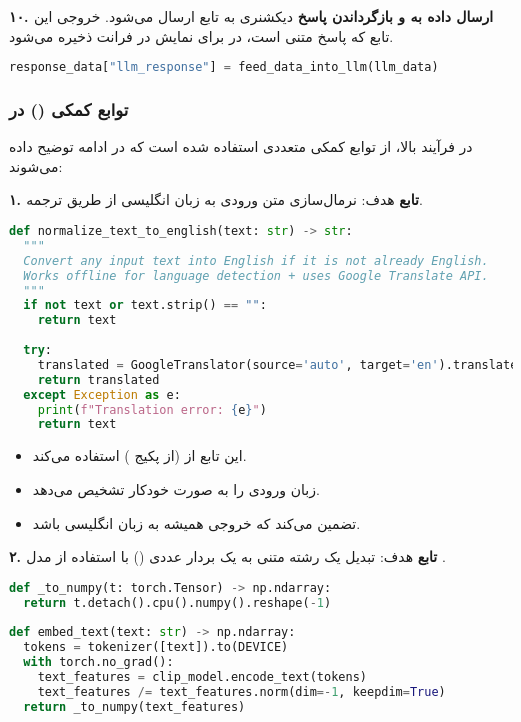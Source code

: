 \documentclass{article}
\begin{document}
\textbf{۱۰. ارسال داده به  و بازگرداندن پاسخ}
دیکشنری  به تابع  ارسال می‌شود. خروجی این تابع که پاسخ متنی  است، در  برای نمایش در فرانت ذخیره می‌شود.

\begin{latin}
\begin{lstlisting}[language=Python]
response_data["llm_response"] = feed_data_into_llm(llm_data)
\end{lstlisting}
\end{latin}

\subsubsection{توابع کمکی () در }

در فرآیند بالا، از توابع کمکی متعددی استفاده شده است که در ادامه توضیح داده می‌شوند:

\textbf{۱. تابع }
هدف: نرمال‌سازی متن ورودی به زبان انگلیسی از طریق ترجمه.

\begin{latin}
\begin{lstlisting}[language=Python]
def normalize_text_to_english(text: str) -> str:
  """
  Convert any input text into English if it is not already English.
  Works offline for language detection + uses Google Translate API.
  """
  if not text or text.strip() == "":
    return text
 
  try:
    translated = GoogleTranslator(source='auto', target='en').translate(text)
    return translated
  except Exception as e:
    print(f"Translation error: {e}")
    return text
\end{lstlisting}
\end{latin}

\begin{itemize}
    \item این تابع از  (از پکیج ) استفاده می‌کند.
    \item {} زبان ورودی را به صورت خودکار تشخیص می‌دهد.
    \item {} تضمین می‌کند که خروجی همیشه به زبان انگلیسی باشد.
\end{itemize}

\textbf{۲. تابع }
هدف: تبدیل یک رشته متنی به یک بردار عددی () با استفاده از مدل .

\begin{latin}
\begin{lstlisting}[language=Python]
def _to_numpy(t: torch.Tensor) -> np.ndarray:
  return t.detach().cpu().numpy().reshape(-1)
 
def embed_text(text: str) -> np.ndarray:
  tokens = tokenizer([text]).to(DEVICE)
  with torch.no_grad():
    text_features = clip_model.encode_text(tokens)
    text_features /= text_features.norm(dim=-1, keepdim=True)
  return _to_numpy(text_features)
\end{lstlisting}
\end{latin}
\end{document}
